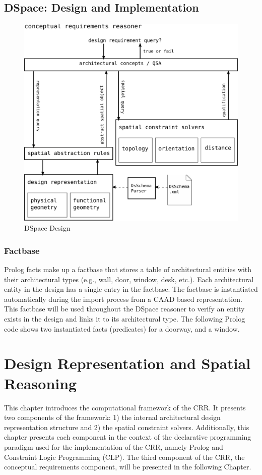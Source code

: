 \documentclass[12pt]{ucthesis}
\begin{document}
\section{DSpace: Design and Implementation}
\begin{figure}[H]
\centering
\includegraphics[width=130mm]{design}
\caption{DSpace Design}
\label{dspace design}
\end{figure}


\subsection{Factbase}
Prolog facts make up a factbase that stores a table of architectural entities with their architectural types (e.g., wall, door, window, desk, etc.). Each architectural entity in the design has a single entry in the factbase. The factbase is instantiated automatically during the import process from a CAAD based representation. This factbase will be used throughout the DSpace reasoner to  verify an entity exists in the design and links it to its architectural type. The following Prolog code shows two instantiated facts (predicates) for a doorway, and a window. 



\chapter{Design Representation and Spatial Reasoning}
This chapter introduces the computational framework of the CRR. It presents two components of the framework: 1) the internal architectural design representation structure and 2) the spatial constraint solvers. Additionally, this chapter presents each component in the context of the declarative programming paradigm used for the implementation of the CRR, namely Prolog and Constraint Logic Programming (CLP). The third component  of the CRR, the conceptual requirements component, will be presented in the following Chapter.
\end{document}
